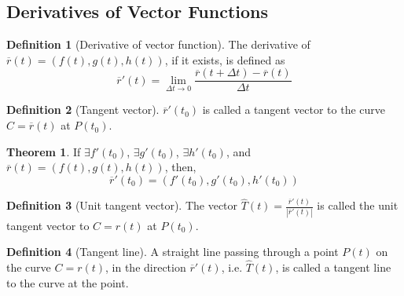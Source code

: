 \documentclass[fleqn, a4paper, 8pt, twoside]{amsart}
\theoremstyle{definition}
\theoremstyle{bluedefinition}
\newtheorem{definition}{Definition}
\theoremstyle{redtheorem}
\newtheorem{theorem}{Theorem}
\begin{document}
\begin{multicols}{2}
\begin{spacing}{0.7}
\section{Derivatives of Vector Functions}

\begin{definition}[Derivative of vector function]
	The derivative of $\overline{r}(t) = \left( f(t), g(t), h(t) \right)$, if it exists, is defined as
	\begin{equation*}
		\overline{r}'(t) = \lim\limits_{\Delta t \to 0} \frac{\overline{r}(t + \Delta t) - \overline{r}(t)}{\Delta t}
	\end{equation*}
\end{definition}

\begin{definition}[Tangent vector]
	$\overline{r}'(t_0)$ is called a tangent vector to the curve $C = \overline{r}(t)$ at $P(t_0)$.
\end{definition}

\begin{theorem}
	If $\exists f'(t_0)$, $\exists g'(t_0)$, $\exists h'(t_0)$, and $\overline{r}(t) = \left( f(t), g(t), h(t) \right)$, then,
	\begin{equation*}
		\overline{r}'(t_0) = \left( f'(t_0), g'(t_0), h'(t_0) \right)
	\end{equation*}
\end{theorem}

\begin{definition}[Unit tangent vector]
	The vector $\hat{T}(t) = \frac{\overline{r}'(t)}{\left| \overline{r}'(t) \right|}$ is called the unit tangent vector to $C = r(t)$ at $P(t_0)$.
\end{definition}

\begin{definition}[Tangent line]
	A straight line passing through a point $P(t)$ on the curve $C = r(t)$, in the direction $\overline{r}'(t)$, i.e. $\hat{T}(t)$, is called a tangent line to the curve at the point.
\end{definition}


\end{spacing}
\end{multicols}
\end{document}
